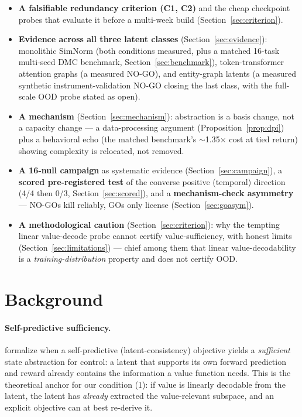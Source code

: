 \documentclass{article}
\begin{document}
\begin{itemize}
\item \textbf{A falsifiable redundancy criterion (C1, C2)} and the cheap checkpoint probes that evaluate it before a multi-week build (Section~\ref{sec:criterion}).
\item \textbf{Evidence across all three latent classes} (Section~\ref{sec:evidence}): monolithic SimNorm (both conditions measured, plus a matched 16-task multi-seed DMC benchmark, Section~\ref{sec:benchmark}), token-transformer attention graphs (a measured NO-GO), and entity-graph latents (a measured synthetic instrument-validation NO-GO closing the last class, with the full-scale OOD probe stated as open).
\item \textbf{A mechanism} (Section~\ref{sec:mechanism}): abstraction is a basis change, not a capacity change --- a data-processing argument (Proposition~\ref{prop:dpi}) plus a behavioral echo (the matched benchmark's $\sim$1.35$\times$ cost at tied return) showing complexity is relocated, not removed.
\item \textbf{A 16-null campaign} as systematic evidence (Section~\ref{sec:campaign}), a \textbf{scored pre-registered test} of the converse positive (temporal) direction (4/4 then 0/3, Section~\ref{sec:scored}), and a \textbf{mechanism-check asymmetry} --- NO-GOs kill reliably, GOs only license (Section~\ref{sec:goasym}).
\item \textbf{A methodological caution} (Section~\ref{sec:criterion}): why the tempting linear value-decode probe cannot certify value-sufficiency, with honest limits (Section~\ref{sec:limitations}) --- chief among them that linear value-decodability is a \emph{training-distribution} property and does not certify OOD.
\end{itemize}

\section{Background}
\label{sec:background}

\paragraph{Self-predictive sufficiency.} \citet{ni2024bridging} formalize when a self-predictive (latent-consistency) objective yields a \emph{sufficient} state abstraction for control: a latent that supports its own forward prediction and reward already contains the information a value function needs. This is the theoretical anchor for our condition (1): if value is linearly decodable from the latent, the latent has \emph{already} extracted the value-relevant subspace, and an explicit objective can at best re-derive it.
\end{document}
